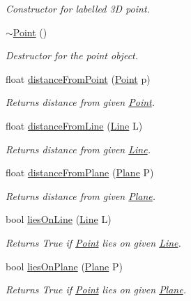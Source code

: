 \begin{DoxyCompactItemize}
\begin{DoxyCompactList}\small\item\em Constructor for labelled 3D point. \end{DoxyCompactList}\item 
\mbox{\hyperlink{class_point_a395fa04b4ec126b66fc053f829a30cc1}{$\sim$\+Point}} ()
\begin{DoxyCompactList}\small\item\em Destructor for the point object. \end{DoxyCompactList}\item 
float \mbox{\hyperlink{class_point_a94bcbad2f7120c466739610bfd84932c}{distance\+From\+Point}} (\mbox{\hyperlink{class_point}{Point}} p)
\begin{DoxyCompactList}\small\item\em Returns distance from given \mbox{\hyperlink{class_point}{Point}}. \end{DoxyCompactList}\item 
float \mbox{\hyperlink{class_point_a4975f26f6258a4d5ebd57d180f7677fd}{distance\+From\+Line}} (\mbox{\hyperlink{class_line}{Line}} L)
\begin{DoxyCompactList}\small\item\em Returns distance from given \mbox{\hyperlink{class_line}{Line}}. \end{DoxyCompactList}\item 
float \mbox{\hyperlink{class_point_a965dffb2059032cc1ce8c1a33c4d6684}{distance\+From\+Plane}} (\mbox{\hyperlink{class_plane}{Plane}} P)
\begin{DoxyCompactList}\small\item\em Returns distance from given \mbox{\hyperlink{class_plane}{Plane}}. \end{DoxyCompactList}\item 
bool \mbox{\hyperlink{class_point_addde199c01d6de0ce974fd7b89e4cba4}{lies\+On\+Line}} (\mbox{\hyperlink{class_line}{Line}} L)
\begin{DoxyCompactList}\small\item\em Returns True if \mbox{\hyperlink{class_point}{Point}} lies on given \mbox{\hyperlink{class_line}{Line}}. \end{DoxyCompactList}\item 
bool \mbox{\hyperlink{class_point_ace2ed8e26893f5659e9f4fe94dc67094}{lies\+On\+Plane}} (\mbox{\hyperlink{class_plane}{Plane}} P)
\begin{DoxyCompactList}\small\item\em Returns True if \mbox{\hyperlink{class_point}{Point}} lies on given \mbox{\hyperlink{class_plane}{Plane}}. \end{DoxyCompactList}\item 

\end{DoxyCompactItemize}
